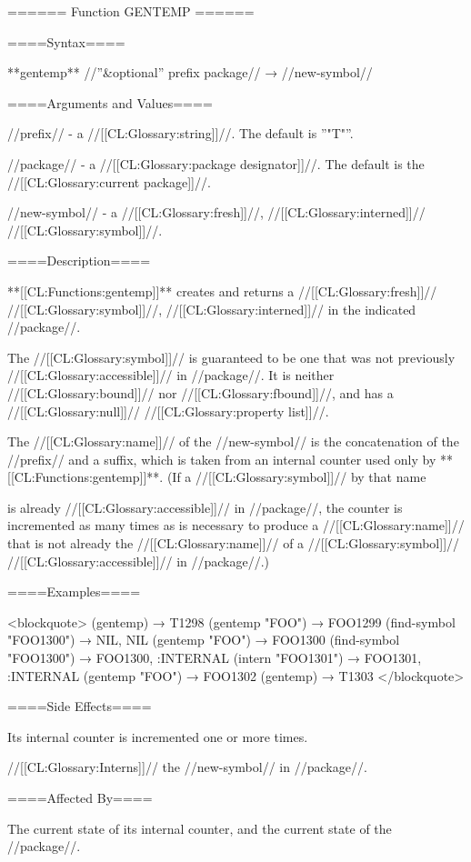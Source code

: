 ====== Function GENTEMP ======

====Syntax====

**gentemp** //''&optional'' prefix package// → //new-symbol//

====Arguments and Values====

//prefix// - a //[[CL:Glossary:string]]//. The default is ''"T"''.

//package// - a //[[CL:Glossary:package designator]]//. The default is the //[[CL:Glossary:current package]]//.

//new-symbol// - a //[[CL:Glossary:fresh]]//, //[[CL:Glossary:interned]]// //[[CL:Glossary:symbol]]//.

====Description====

**[[CL:Functions:gentemp]]** creates and returns a //[[CL:Glossary:fresh]]// //[[CL:Glossary:symbol]]//, //[[CL:Glossary:interned]]// in the indicated //package//.

The //[[CL:Glossary:symbol]]// is guaranteed to be one that was not previously //[[CL:Glossary:accessible]]// in //package//. It is neither //[[CL:Glossary:bound]]// nor //[[CL:Glossary:fbound]]//, and has a //[[CL:Glossary:null]]// //[[CL:Glossary:property list]]//.

The //[[CL:Glossary:name]]// of the //new-symbol// is the concatenation of the //prefix// and a suffix, which is taken from an internal counter used only by **[[CL:Functions:gentemp]]**. (If a //[[CL:Glossary:symbol]]// by that name

is already //[[CL:Glossary:accessible]]// in //package//, the counter is incremented as many times as is necessary to produce a //[[CL:Glossary:name]]// that is not already the //[[CL:Glossary:name]]// of a //[[CL:Glossary:symbol]]// //[[CL:Glossary:accessible]]// in //package//.)

====Examples====

<blockquote> (gentemp) → T1298 (gentemp "FOO") → FOO1299 (find-symbol "FOO1300") → NIL, NIL (gentemp "FOO") → FOO1300 (find-symbol "FOO1300") → FOO1300, :INTERNAL (intern "FOO1301") → FOO1301, :INTERNAL (gentemp "FOO") → FOO1302 (gentemp) → T1303 </blockquote>

====Side Effects====

Its internal counter is incremented one or more times.

//[[CL:Glossary:Interns]]// the //new-symbol// in //package//.

====Affected By====

The current state of its internal counter, and the current state of the //package//.

